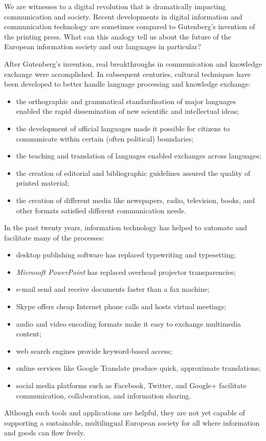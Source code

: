 \begin{multicols}{2}

    We are witnesses to a digital revolution that is dramatically impacting communication and society. Recent developments in digital information and communication technology are sometimes compared to Gutenberg’s invention of the printing press. What can this analogy tell us about the future of the European information society and our languages in particular?


    After Gutenberg’s invention, real breakthroughs in communication and knowledge exchange were accomplished. In subsequent centuries, cultural techniques have been developed to better handle language processing and knowledge exchange:
    \begin{itemize}
      \item the orthographic and grammatical standardisation of major languages enabled the rapid dissemination of new 
      scientific and intellectual ideas;
      \item the development of official languages made it possible for citizens to communicate within certain (often 
      political) boundaries;
      \item the teaching and translation of languages enabled exchanges across languages;
      \item the creation of editorial and bibliographic guidelines assured the quality of printed 
      material;
      \item the creation of different media like newspapers, radio, television, books, and other formats satisfied 
      different communication needs. 
    \end{itemize}
    In the past twenty years, information technology has helped to automate and facilitate many of the processes:
    \begin{itemize}
      \item desktop publishing software has replaced typewriting and typesetting;
      \item \textit{Microsoft PowerPoint} has replaced overhead projector transparencies;
      \item e-mail send and receive documents faster than a fax machine;
      \item Skype offers cheap Internet phone calls and hosts virtual meetings;
      \item audio and video encoding formats make it easy to exchange multimedia content;
      \item web search engines provide keyword-based access;
      \item online services like Google Translate produce quick, approximate translations;
      \item social media platforms such as Facebook, Twitter, and Google+ facilitate communication, collaboration, and information sharing.
    \end{itemize}
    Although such tools and applications are helpful, they are not yet capable of supporting a sustainable, multilingual European society for all where information and goods can flow freely.


\end{multicols}
